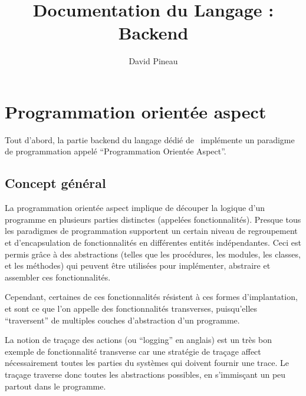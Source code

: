 \documentclass[french]{rtxreport}
\author{David Pineau}
\title{Documentation du Langage : Backend}
\begin{document}
\maketitle

\rtxmaketitleblock

\tableofcontents



\chapter{Programmation orientée aspect}

Tout d'abord, la partie backend du langage dédié de \rtx\ implémente un
paradigme de programmation appelé ``Programmation Orientée Aspect''.

\section{Concept général}

La programmation orientée aspect implique de découper la logique d'un programme
en plusieurs parties distinctes (appelées fonctionnalités). Presque tous les
paradigmes de programmation supportent un certain niveau de regroupement et
d'encapsulation de fonctionnalités en différentes entités indépendantes. Ceci
est permis grâce à des abstractions (telles que les procédures, les modules,
les classes, et les méthodes) qui peuvent être utilisées pour implémenter,
abstraire et assembler ces fonctionnalités.

Cependant, certaines de ces fonctionnalités résistent à ces formes
d'implantation, et sont ce que l'on appelle des fonctionnalités transverses,
puisqu'elles ``traversent'' de multiples couches d'abstraction d'un programme.

La notion de traçage des actions (ou ``logging'' en anglais) est un très bon
exemple de fonctionnalité transverse car une stratégie de traçage affect
nécessairement toutes les parties du systèmes qui doivent fournir une trace. Le
traçage traverse donc toutes les abstractions possibles, en s'immisçant un peu
partout dans le programme.
\end{document}
